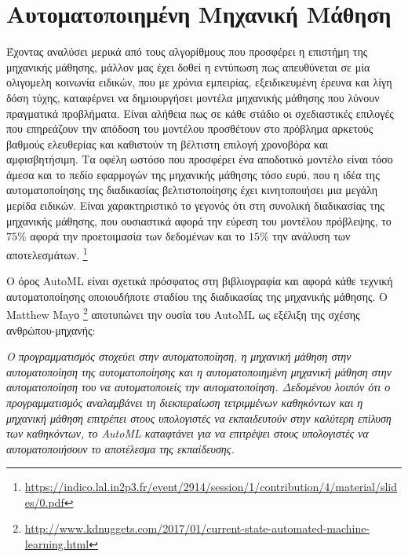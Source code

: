 \section{Αυτοματοποιημένη Μηχανική Μάθηση}
 Έχοντας αναλύσει μερικά από τους αλγορίθμους που προσφέρει η επιστήμη της μηχανικής μάθησης, μάλλον μας έχει δοθεί η εντύπωση πως απευθύνεται σε μία ολιγομελη κοινωνία ειδικών, που με χρόνια εμπειρίας, εξειδικευμένη έρευνα και λίγη δόση τύχης, καταφέρνει να δημιουργήσει μοντέλα μηχανικής μάθησης που λύνουν πραγματικά προβλήματα. Είναι αλήθεια πως σε κάθε στάδιο οι σχεδιαστικές επιλογές που επηρεάζουν την απόδοση του μοντέλου προσθέτουν στο πρόβλημα αρκετούς βαθμούς ελευθερίας και καθιστούν τη βέλτιστη επιλογή χρονοβόρα και αμφισβητήσιμη. Τα οφέλη ωστόσο που προσφέρει ένα αποδοτικό μοντέλο είναι τόσο άμεσα και το πεδίο εφαρμογών της μηχανικής μάθησης τόσο ευρύ, που η ιδέα της αυτοματοποίησης της διαδικασίας βελτιστοποίησης έχει κινητοποιήσει μια μεγάλη μερίδα ειδικών. Είναι χαρακτηριστικό
 το γεγονός ότι στη συνολική διαδικασίας της μηχανικής μάθησης, που ουσιαστικά αφορά την εύρεση του μοντέλου πρόβλεψης, το $75\%$ αφορά την προετοιμασία των δεδομένων και το $15\%$ την ανάλυση των αποτελεσμάτων. \footnote{\url{https://indico.lal.in2p3.fr/event/2914/session/1/contribution/4/material/slides/0.pdf}}
 
 Ο όρος AutoML είναι σχετικά πρόσφατος στη βιβλιογραφία και αφορά κάθε τεχνική
 αυτοματοποίησης οποιουδήποτε σταδίου της διαδικασίας της μηχανικής μάθησης. Ο Matthew Mayο \footnote{\url{http://www.kdnuggets.com/2017/01/current-state-automated-machine-learning.html}} αποτυπώνει την ουσία του AutoML ως εξέλιξη της σχέσης ανθρώπου-μηχανής:
 
 \begin{displayquote}
 \textit{Ο προγραμματισμός στοχεύει στην αυτοματοποίηση, η μηχανική μάθηση στην αυτοματοποίηση της αυτοματοποίησης και η αυτοματοποιημένη μηχανική μάθηση στην αυτοματοποίηση του να αυτοματοποιείς την αυτοματοποίηση. Δεδομένου λοιπόν ότι ο προγραμματισμός αναλαμβάνει τη διεκπεραίωση τετριμμένων καθηκόντων και η μηχανική μάθηση επιτρέπει στους υπολογιστές να εκπαιδευτούν στην καλύτερη επίλυση των καθηκόντων, το AutoML καταφτάνει για να επιτρέψει στους υπολογιστές να αυτοματοποιήσουν το αποτέλεσμα της εκπαίδευσης.}
 \end{displayquote}
 
